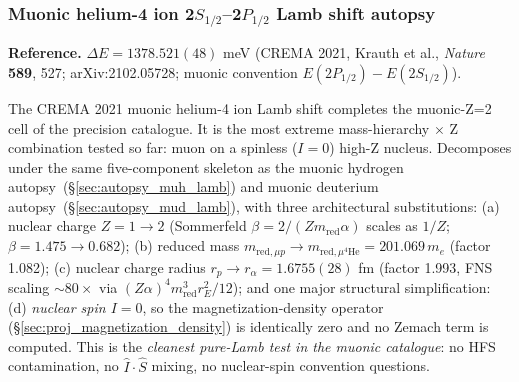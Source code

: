 \documentclass[11pt]{article}
\begin{document}
\subsubsection{Muonic helium-4 ion 2$S_{1/2}$--2$P_{1/2}$ Lamb shift autopsy}
\label{sec:autopsy_muhe4_lamb}

\textbf{Reference.} $\Delta E = 1378.521(48)$ meV (CREMA 2021, Krauth
et al., \emph{Nature} \textbf{589}, 527; arXiv:2102.05728; muonic
convention $E(2P_{1/2}) - E(2S_{1/2})$).

The CREMA 2021 muonic helium-4 ion Lamb shift completes the muonic-Z=2
cell of the precision catalogue.  It is the most extreme mass-hierarchy
$\times$ Z combination tested so far: muon on a spinless ($I=0$)
high-Z nucleus.  Decomposes under the same five-component skeleton
as the muonic hydrogen autopsy~(\S\ref{sec:autopsy_muh_lamb}) and
muonic deuterium autopsy~(\S\ref{sec:autopsy_mud_lamb}), with three
architectural substitutions: (a) nuclear charge $Z = 1 \to 2$
(Sommerfeld $\beta = 2/(Z m_\text{red} \alpha)$ scales as $1/Z$;
$\beta = 1.475 \to 0.682$); (b) reduced mass $m_{\text{red},\mu p} \to
m_{\text{red},\mu^4\text{He}} = 201.069\,m_e$ (factor 1.082);
(c) nuclear charge radius $r_p \to r_\alpha = 1.6755(28)$ fm
(factor 1.993, FNS scaling $\sim 80\times$ via $(Z\alpha)^4
m_\text{red}^3 r_E^2/12$); and one major structural simplification:
(d) \emph{nuclear spin $I = 0$}, so the magnetization-density operator
(\S\ref{sec:proj_magnetization_density}) is identically zero and no
Zemach term is computed.  This is the \emph{cleanest pure-Lamb test
in the muonic catalogue}: no HFS contamination, no $\hat I \cdot \hat S$
mixing, no nuclear-spin convention questions.
\end{document}
